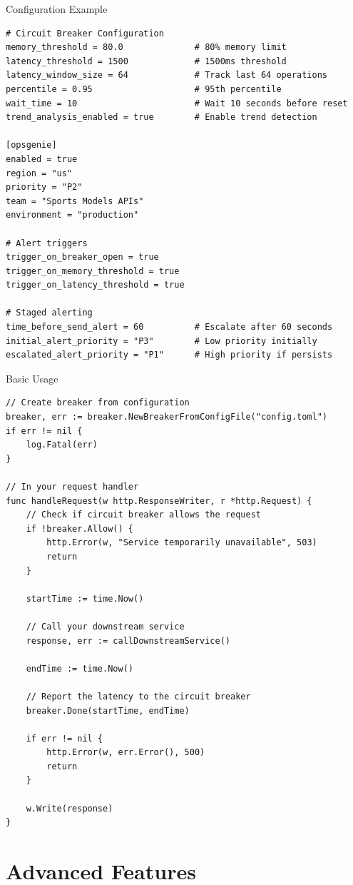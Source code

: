 \documentclass[aspectratio=169]{beamer}
\begin{document}
\begin{frame}[fragile]{Configuration Example}
\begin{lstlisting}[style=gostyle]
# Circuit Breaker Configuration
memory_threshold = 80.0              # 80% memory limit
latency_threshold = 1500             # 1500ms threshold
latency_window_size = 64             # Track last 64 operations
percentile = 0.95                    # 95th percentile
wait_time = 10                       # Wait 10 seconds before reset
trend_analysis_enabled = true        # Enable trend detection

[opsgenie]
enabled = true
region = "us"
priority = "P2"
team = "Sports Models APIs"
environment = "production"

# Alert triggers
trigger_on_breaker_open = true
trigger_on_memory_threshold = true
trigger_on_latency_threshold = true

# Staged alerting
time_before_send_alert = 60          # Escalate after 60 seconds
initial_alert_priority = "P3"        # Low priority initially
escalated_alert_priority = "P1"      # High priority if persists
\end{lstlisting}
\end{frame}

\begin{frame}[fragile]{Basic Usage}
\begin{lstlisting}[style=gostyle]
// Create breaker from configuration
breaker, err := breaker.NewBreakerFromConfigFile("config.toml")
if err != nil {
    log.Fatal(err)
}

// In your request handler
func handleRequest(w http.ResponseWriter, r *http.Request) {
    // Check if circuit breaker allows the request
    if !breaker.Allow() {
        http.Error(w, "Service temporarily unavailable", 503)
        return
    }
    
    startTime := time.Now()
    
    // Call your downstream service
    response, err := callDownstreamService()
    
    endTime := time.Now()
    
    // Report the latency to the circuit breaker
    breaker.Done(startTime, endTime)
    
    if err != nil {
        http.Error(w, err.Error(), 500)
        return
    }
    
    w.Write(response)
}
\end{lstlisting}
\end{frame}

\section{Advanced Features}
\end{document}
